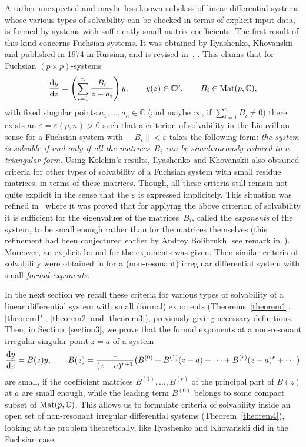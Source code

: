 A rather unexpected and maybe less known subclass of linear differential systems whose various types of solvability
can be checked in terms of explicit input data, is formed by systems with sufficiently small matrix coefficients.
The first result of this kind concerns Fuchsian systems. It was obtained by Ilyashenko, Khovanskii and published in
1974 in Russian, and is revised in~\cite{Kh1}, \cite[Chapter~6, Section~2.3]{Kh2}. This claims that for Fuchsian $(p\times p)$-systems
\begin{gather*}
\frac{{\rm d}y}{{\rm d}z}=\left(\sum_{i=1}^n\frac{B_i}{z-a_i}\right)y, \qquad y(z)\in{\mathbb C}^p, \qquad B_i\in{\rm Mat}(p,{\mathbb C}),
\end{gather*}
with fixed singular points $a_1,\ldots,a_n\in\mathbb C$ (and maybe $\infty$, if $\sum\limits_{i=1}^nB_i\ne0$) there exists an
$\varepsilon=\varepsilon(p,n)>0$ such that a criterion of solvability in the Liouvillian sense for a Fuchsian system
with $\|B_i\|<\varepsilon$ takes the following form: {\it the system is solvable if and only if all the matrices~$B_i$ can be
simultaneously reduced to a triangular form}. Using Kolchin's results, Ilyashenko and Khovanskii also obtained criteria for
other types of solvability of a Fuchsian system with small residue matrices, in terms of these matrices. Though, all these
criteria still remain not quite explicit in the sense that the $\varepsilon$ is expressed implicitely. This situation was
refined in~\cite{VG} where it was proved that for applying the above criterion of solvability it is sufficient for the eigenvalues of the matrices~$B_i$, called the {\it exponents} of the system, to be small enough rather than for the matrices themselves (this refinement had been conjectured earlier by Andrey Bolibrukh, see remark in~\cite[Section~6.2.3]{Kh1}). Moreover, an explicit bound for the exponents was given. Then similar criteria of solvability were obtained in \cite{GV} for a (non-resonant) irregular differential system with small {\it formal exponents}.

In the next section we recall these criteria for various types of solvability of a linear differential system with small (formal) exponents (Theorems~\ref{theorem1}, \ref{theorem1'}, \ref{theorem2} and \ref{theorem3}), previously giving necessary definitions. Then, in Section~\ref{section3}, we prove that the formal exponents at a non-resonant irregular singular point $z=a$ of a system
\begin{gather}\label{syst1}
\frac{{\rm d}y}{{\rm d}z}=B(z) y, \qquad B(z)=\frac1{(z-a)^{r+1}}\bigl(B^{(0)}+B^{(1)}(z-a)+\cdots+B^{(r)}(z-a)^r+\cdots\bigr)
\end{gather}
are small, if the coefficient matrices $B^{(1)},\ldots,B^{(r)}$ of the principal part of $B(z)$ at $a$ are small enough, while the leading term $B^{(0)}$ belongs to some compact subset of ${\rm Mat}(p,{\mathbb C})$. This allows us to formulate criteria of solvability inside an open set of non-resonant irregular differential systems (Theorem~\ref{theorem4}), looking at the problem theoretically, like Ilyashenko and Khovanskii did in the Fuchsian case.

